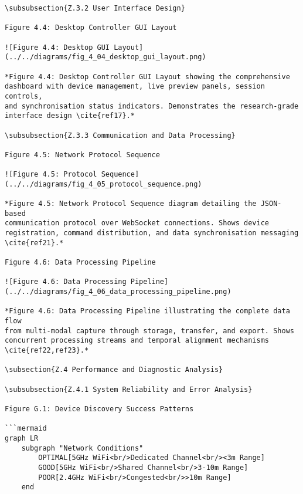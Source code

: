 \begin{verbatim}
\subsubsection{Z.3.2 User Interface Design}

Figure 4.4: Desktop Controller GUI Layout

![Figure 4.4: Desktop GUI Layout](../../diagrams/fig_4_04_desktop_gui_layout.png)

*Figure 4.4: Desktop Controller GUI Layout showing the comprehensive
dashboard with device management, live preview panels, session controls,
and synchronisation status indicators. Demonstrates the research-grade
interface design \cite{ref17}.*

\subsubsection{Z.3.3 Communication and Data Processing}

Figure 4.5: Network Protocol Sequence

![Figure 4.5: Protocol Sequence](../../diagrams/fig_4_05_protocol_sequence.png)

*Figure 4.5: Network Protocol Sequence diagram detailing the JSON-based
communication protocol over WebSocket connections. Shows device
registration, command distribution, and data synchronisation messaging
\cite{ref21}.*

Figure 4.6: Data Processing Pipeline

![Figure 4.6: Data Processing Pipeline](../../diagrams/fig_4_06_data_processing_pipeline.png)

*Figure 4.6: Data Processing Pipeline illustrating the complete data flow
from multi-modal capture through storage, transfer, and export. Shows
concurrent processing streams and temporal alignment mechanisms \cite{ref22,ref23}.*

\subsection{Z.4 Performance and Diagnostic Analysis}

\subsubsection{Z.4.1 System Reliability and Error Analysis}

Figure G.1: Device Discovery Success Patterns

```mermaid
graph LR
    subgraph "Network Conditions"
        OPTIMAL[5GHz WiFi<br/>Dedicated Channel<br/><3m Range]
        GOOD[5GHz WiFi<br/>Shared Channel<br/>3-10m Range]
        POOR[2.4GHz WiFi<br/>Congested<br/>>10m Range]
    end


\end{verbatim}
